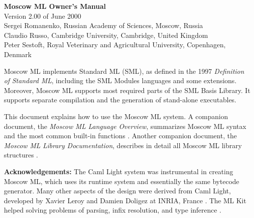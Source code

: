 \documentclass[fleqn]{article}
\begin{document}
\begin{center}

  {\huge\bf Moscow ML Owner's Manual}\\[0.5cm]

Version 2.00 of June 2000\\[0.7cm]

Sergei Romanenko, Russian Academy of Sciences, Moscow, Russia\\
Claudio Russo, Cambridge University, Cambridge, United Kingdom\\
Peter Sestoft, Royal Veterinary and Agricultural University, 
Copenhagen, Denmark

\end{center}

\vspace{0.5cm}

\noindent 
Moscow ML implements Standard ML (SML), as defined in the 1997 {\em
  Definition of Standard ML\/}, including the SML Modules languages
and some extensions.  Moreover, Moscow ML supports most required parts
of the SML Basis Library.  It supports separate compilation and the
generation of stand-alone executables.

This document explains how to use the Moscow ML system.  A companion
document, the {\em Moscow ML Language Overview\/}, summarizes Moscow
ML syntax and the most common built-in functions
\cite{MoscowML:2000:MoscowMLLanguage}.  Another companion document,
the \emph{Moscow ML Library Documentation}, describes in detail all
Moscow ML library structures \cite{MoscowML:2000:MoscowMLLibrary}. 

{\bf Acknowledgements:} The Caml Light system was instrumental in
creating Moscow ML, which uses its runtime system and essentially the
same bytecode generator.  Many other aspects of the design were
derived from Caml Light, developed by Xavier Leroy and Damien Doligez
at INRIA, France \cite{Leroy:1990:TheZinc,Leroy:1993:TheCaml}.  The ML
Kit helped solving problems of parsing, infix resolution, and type
inference \cite{Birkedal:1993:TheML}.

\vfill
\end{document}
